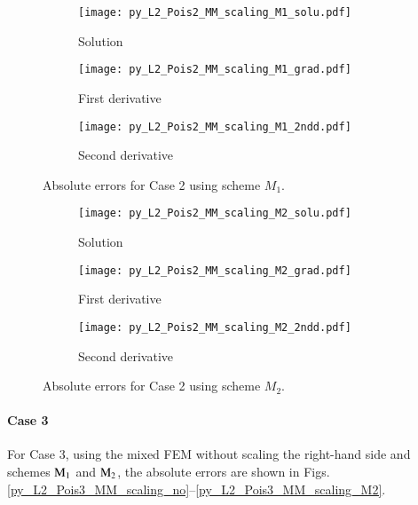 \documentclass[review,3p]{elsarticle}
\begin{document}
\begin{figure}[!ht]
    \begin{subfigure}{5.5cm}
        \texttt{[image: py\_L2\_Pois2\_MM\_scaling\_M1\_solu.pdf]}
        \caption{Solution}
        \label{py_L2_Pois2_MM_scaling_M1_solu}
    \end{subfigure}
    \hspace{-0.2cm}
    \begin{subfigure}{5.5cm}
        \texttt{[image: py\_L2\_Pois2\_MM\_scaling\_M1\_grad.pdf]}
        \caption{First derivative}
        \label{py_L2_Pois2_MM_scaling_M1_grad}
    \end{subfigure}
    \hspace{-0.2cm}
    \begin{subfigure}{5.5cm}
        \texttt{[image: py\_L2\_Pois2\_MM\_scaling\_M1\_2ndd.pdf]}
        \caption{Second derivative}
        \label{py_L2_Pois2_MM_scaling_M1_2ndd}
    \end{subfigure}
\caption{Absolute errors for Case 2 using scheme $M_1$.}
\label{py_L2_Pois2_MM_scaling_M1}
\end{figure}

\begin{figure}[!ht]
    \begin{subfigure}{5.5cm}
        \texttt{[image: py\_L2\_Pois2\_MM\_scaling\_M2\_solu.pdf]}
        \caption{Solution}
        \label{py_L2_Pois2_MM_scaling_M2_solu}
    \end{subfigure}
    \hspace{-0.2cm}
    \begin{subfigure}{5.5cm}
        \texttt{[image: py\_L2\_Pois2\_MM\_scaling\_M2\_grad.pdf]}
        \caption{First derivative}
        \label{py_L2_Pois2_MM_scaling_M2_grad}
    \end{subfigure}
    \hspace{-0.2cm}
    \begin{subfigure}{5.5cm}
        \texttt{[image: py\_L2\_Pois2\_MM\_scaling\_M2\_2ndd.pdf]}
        \caption{Second derivative}
        \label{py_L2_Pois2_MM_scaling_M2_2ndd}
    \end{subfigure}
\caption{Absolute errors for Case 2 using scheme $M_2$.}
\label{py_L2_Pois2_MM_scaling_M2}
\end{figure}

\newpage
\paragraph{Case 3}
For Case 3, using the mixed FEM without scaling the right-hand side and schemes ${\rm M}_1$ and ${\rm M}_2$, the absolute errors are shown in Figs. \ref{py_L2_Pois3_MM_scaling_no}--\ref{py_L2_Pois3_MM_scaling_M2}.
\end{document}
